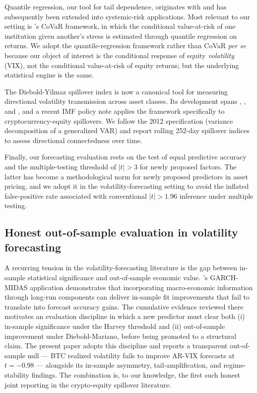 \documentclass[11pt,a4paper]{article}
\begin{document}
Quantile regression, our tool for tail dependence, originates with \citet{koenker1978} and has subsequently been extended into systemic-risk applications. Most relevant to our setting is \citet{adrian2016}'s CoVaR framework, in which the conditional value-at-risk of one institution given another's stress is estimated through quantile regression on returns. We adopt the quantile-regression framework rather than CoVaR \emph{per se} because our object of interest is the conditional response of equity \emph{volatility} (VIX), not the conditional value-at-risk of equity returns; but the underlying statistical engine is the same.

The Diebold-Yilmaz spillover index is now a canonical tool for measuring directional volatility transmission across asset classes. Its development spans \citet{diebold2009}, \citet{diebold2012}, and \citet{diebold2014network}, and a recent IMF policy note \citep{iyer2022} applies the framework specifically to cryptocurrency-equity spillovers. We follow the 2012 specification (variance decomposition of a generalized VAR) and report rolling 252-day spillover indices to assess directional connectedness over time.

Finally, our forecasting evaluation rests on the \citet{diebold1995} test of equal predictive accuracy and the \citet{harvey2016} multiple-testing threshold of $|t| > 3$ for newly proposed factors. The latter has become a methodological norm for newly proposed predictors in asset pricing, and we adopt it in the volatility-forecasting setting to avoid the inflated false-positive rate associated with conventional $|t| > 1.96$ inference under multiple testing.

\subsection{Honest out-of-sample evaluation in volatility forecasting}

A recurring tension in the volatility-forecasting literature is the gap between in-sample statistical significance and out-of-sample economic value. \citet{conrad2020}'s GARCH-MIDAS application demonstrates that incorporating macro-economic information through long-run components can deliver in-sample fit improvements that fail to translate into forecast accuracy gains. The cumulative evidence reviewed there motivates an evaluation discipline in which a new predictor must clear both (i) in-sample significance under the Harvey threshold and (ii) out-of-sample improvement under Diebold-Mariano, before being promoted to a structural claim. The present paper adopts this discipline and reports a transparent out-of-sample null --- BTC realized volatility fails to improve AR-VIX forecasts at $t = -0.98$ --- alongside its in-sample asymmetry, tail-amplification, and regime-stability findings. The combination is, to our knowledge, the first such honest joint reporting in the crypto-equity spillover literature.
\end{document}

